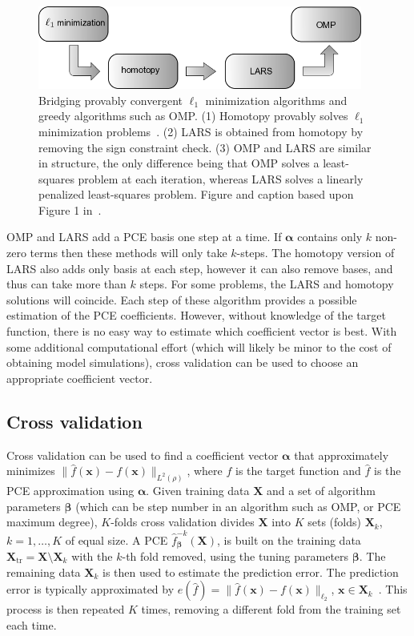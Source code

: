 \begin{figure}[h]
\centering
\includegraphics[width=0.95\textwidth]{images/compressed-sensing-hierarchy.png}
\caption{Bridging provably convergent $\ell_1$ minimization algorithms and greedy 
algorithms such as OMP. (1) Homotopy provably solves $\ell_1$ minimization 
problems~\cite{Efron2004}. (2) LARS is obtained from homotopy by removing
the sign constraint check. (3) OMP and LARS are similar in structure, 
the only difference being that OMP solves a least-squares problem at each iteration,
whereas LARS solves a linearly penalized least-squares problem. 
Figure and caption based upon Figure 1 in~\cite{Donoho2008}.}
\label{fig:compressed-sensing-method-heirarchy}
\end{figure}

OMP and LARS add a PCE basis one step at a time. If $\boldsymbol{\alpha}$ contains
 only $k$ non-zero terms then these methods will only take $k$-steps. 
The homotopy version of LARS also adds only basis at each step, however 
it can also remove bases, and thus can take more than $k$ steps. For some problems, 
the LARS and homotopy solutions will coincide. Each step of these algorithm provides a possible
estimation of the PCE coefficients. However, without knowledge of the target function, there is no
easy way to estimate which coefficient vector is best. With some additional computational 
effort (which will likely be minor to the cost of obtaining model simulations), cross validation 
can be used to choose an appropriate coefficient vector.

\subsection{Cross validation}

Cross validation can be used to find a coefficient vector $\boldsymbol{\alpha}$ 
that approximately minimizes $\| \hat{f}(\mathbf{x})-f(\mathbf{x})\|_{L^2(\rho)}$, where
$f$ is the target function and $\hat{f}$ is the PCE approximation using $\boldsymbol{\alpha}$. 
Given training data $\mathbf{X}$ and a set of algorithm parameters $\boldsymbol{\beta}$ (which can be step number in an 
algorithm such as OMP, or PCE maximum degree), $K$-folds cross validation divides 
$\mathbf{X}$ into $K$ sets (folds) $\mathbf{X}_k$, $k=1,\ldots,K$ of equal size. 
A PCE $\hat{f}^{-k}_{\boldsymbol{\beta}}(\mathbf{X})$, is built on the training data 
$\mathbf{X}_{\mathrm{tr}}=\mathbf{X} \setminus \mathbf{X}_k$ 
with the $k$-th fold removed, using the tuning parameters $\boldsymbol{\beta}$. 
The remaining data $\mathbf{X}_k$ is then used to estimate the prediction error.
The prediction error is typically approximated by
$e(\hat{f})=\lVert \hat{f}(\mathbf{x})-f(\mathbf{x})\rVert_{\ell_2}$, 
$\mathbf{x}\in\mathbf{X}_{k}$~\cite{hastie2001}. This process is then repeated $K$ times, removing a 
different fold from the training set each time. 


